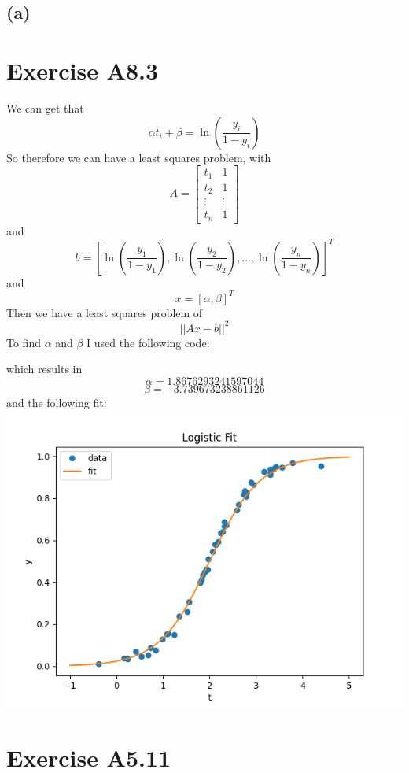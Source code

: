 \subsection*{(a)}
\section*{Exercise A8.3}
We can get that 
$$\alpha t_i+\beta=\ln(\frac{y_i}{1-y_i})$$
So therefore we can have a least squares problem, with
$$A=\begin{bmatrix}
t_1 & 1\\
t_2 & 1\\
\vdots & \vdots\\
t_n & 1
\end{bmatrix}$$
and 
$$b=[\ln(\frac{y_1}{1-y_1}),\ln(\frac{y_2}{1-y_2}),\dots,\ln(\frac{y_n}{1-y_n})]^T$$
and
$$x=[\alpha,\beta]^T$$
Then we have a least squares problem of 
$$||Ax-b||^2$$
To find $\alpha$ and $\beta$ I used the following code:

which results in
$$\alpha=1.8676293241597044$$
$$\beta=-3.739673238861126$$
and the following fit:\\  
\includegraphics[scale=0.5]{"fig2.png"}
\section*{Exercise A5.11}
